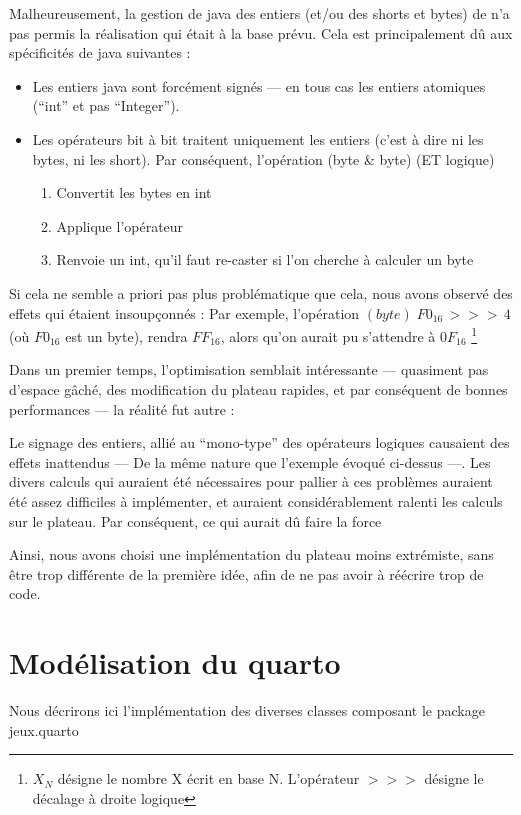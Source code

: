 \documentclass{article}
\begin{document}
Malheureusement, la gestion de java des entiers (et/ou des shorts et bytes) de n'a
pas permis la réalisation qui était à la base prévu. Cela est
principalement dû aux spécificités de java suivantes :
\begin{itemize}
\item Les entiers java sont forcément signés --- en tous cas les
  entiers atomiques (``int'' et pas ``Integer'').
\item Les opérateurs bit à bit traitent uniquement les entiers
  (c'est à dire ni les bytes, ni les short). Par conséquent,
  l'opération (byte \& byte) (ET logique)
  \begin{enumerate}
  \item Convertit les bytes en int 
  \item Applique l'opérateur 
  \item Renvoie un int, qu'il faut re-caster si l'on cherche à calculer un byte
  \end{enumerate}
\end{itemize}
Si cela ne semble a priori pas plus problématique que cela, 
nous avons observé des effets qui étaient
insoupçonnés : Par exemple, l'opération
\((byte)  \; F0_{16} \, >>> \,4 \)  (o\`u \(F0_{16} \) est un byte), rendra
\( FF_{16} \), alors qu'on aurait pu s'attendre à \( 0F_{16} \)
\footnote{ \(X_{N}\) désigne le
  nombre X écrit en base N. L'opérateur \(>>>\) désigne le décalage à
  droite logique}


Dans un premier temps, l'optimisation semblait intéressante ---
quasiment pas d'espace gâché, des modification du plateau rapides, et
par conséquent de bonnes performances --- la réalité fut autre :


Le signage des entiers, allié au ``mono-type'' des opérateurs logiques 
causaient des effets inattendus --- De la même nature que l'exemple
évoqué ci-dessus ---. Les divers calculs qui
auraient été nécessaires pour pallier à ces problèmes auraient été
assez difficiles à implémenter, et auraient considérablement ralenti
les calculs sur le plateau. Par conséquent, ce qui aurait dû faire la
force 


Ainsi, nous avons choisi une implémentation du plateau moins
extrémiste, sans être trop différente de la première idée, afin de ne
pas avoir à réécrire trop de code. 
 
\section{Modélisation du quarto}
Nous décrirons ici l'implémentation des diverses classes composant le
package jeux.quarto
\end{document}
